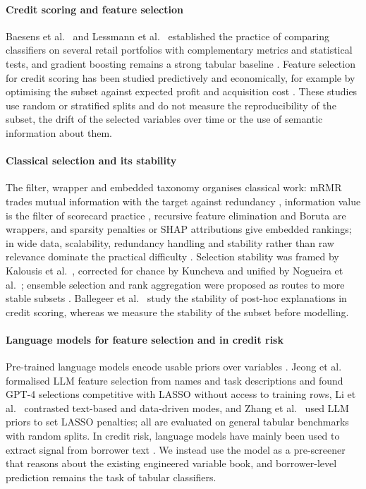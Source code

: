 \documentclass[final,5p,twocolumn]{elsarticle}
\begin{document}
\paragraph{Credit scoring and feature selection}
Baesens et al.\ \cite{baesens2003} and Lessmann et al.\ \cite{lessmann2015} established the practice of comparing classifiers on several retail portfolios with complementary metrics and statistical tests, and gradient boosting remains a strong tabular baseline \cite{gunnarsson2021}. Feature selection for credit scoring has been studied predictively and economically, for example by optimising the subset against expected profit and acquisition cost \cite{maldonado2017}. These studies use random or stratified splits and do not measure the reproducibility of the subset, the drift of the selected variables over time or the use of semantic information about them.

\paragraph{Classical selection and its stability}
The filter, wrapper and embedded taxonomy \cite{kohavi1997,guyon2003} organises classical work: mRMR trades mutual information with the target against redundancy \cite{peng2005}, information value is the filter of scorecard practice \cite{siddiqi2006}, recursive feature elimination \cite{guyon2002} and Boruta \cite{kursa2010,breiman2001} are wrappers, and sparsity penalties \cite{tibshirani1996} or SHAP attributions \cite{lundberg2017} give embedded rankings; in wide data, scalability, redundancy handling and stability rather than raw relevance dominate the practical difficulty \cite{boloncanedo2015}. Selection stability was framed by Kalousis et al.\ \cite{kalousis2007}, corrected for chance by Kuncheva \cite{kuncheva2007} and unified by Nogueira et al.\ \cite{nogueira2018}; ensemble selection and rank aggregation were proposed as routes to more stable subsets \cite{saeys2008,dwork2001}. Ballegeer et al.\ \cite{ballegeer2025} study the stability of post-hoc explanations in credit scoring, whereas we measure the stability of the subset before modelling.

\paragraph{Language models for feature selection and in credit risk}
Pre-trained language models encode usable priors over variables \cite{choi2022}. Jeong et al.\ \cite{jeong2025} formalised LLM feature selection from names and task descriptions and found GPT-4 selections competitive with LASSO without access to training rows, Li et al.\ \cite{li2025sigkdd} contrasted text-based and data-driven modes, and Zhang et al.\ \cite{zhang2025llmlasso} used LLM priors to set LASSO penalties; all are evaluated on general tabular benchmarks with random splits. In credit risk, language models have mainly been used to extract signal from borrower text \cite{sanzguerrero2025,xia2025}. We instead use the model as a pre-screener that reasons about the existing engineered variable book, and borrower-level prediction remains the task of tabular classifiers.
\end{document}

